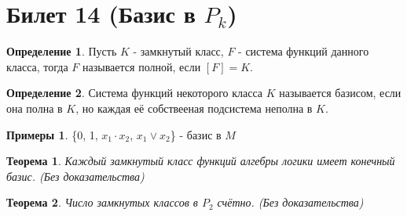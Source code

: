 \documentclass[a4paper, 12pt]{article}
\theoremstyle{definition}
\newtheorem*{definition}{Определение}
\newtheorem*{example}{Примеры}
\theoremstyle{plain}
\newtheorem*{theorem}{Теорема}
\theoremstyle{remark}
\begin{document}
 \section{Билет 14 (Базис в $P_k$)}
  \begin{definition}
    Пусть $K$ - замкнутый класс, $F$ - система функций данного класса, тогда $F$ называется полной, если $[F]=K$.
  \end{definition}
  \begin{definition}
    Система функций некоторого класса $K$ называется базисом, если она полна в $K$, но каждая её собствееная подсистема неполна в $K$.
  \end{definition}
  \begin{example}
    \{0, 1, $x_1\cdot x_2$, $x_1\vee x_2$\} - базис в $M$
  \end{example}
  \begin{theorem}
    Каждый замкнутый класс функций алгебры логики имеет конечный базис. (Без доказательства)
  \end{theorem}
  \begin{theorem}
    Число замкнутых классов в $P_2$ счётно. (Без доказательства)
  \end{theorem}
\end{document}
